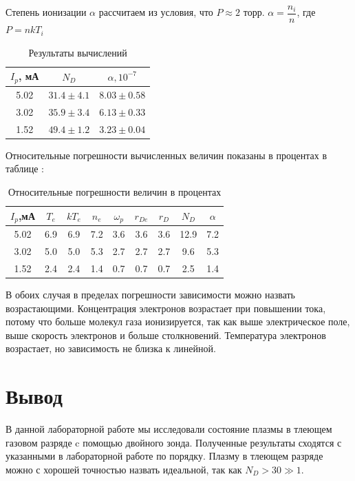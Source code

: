\documentclass[a4paper, 12pt]{article}
\begin{document}
	Степень ионизации $\alpha$ рассчитаем из условия, что $P \approx 2$ торр. $\alpha = \dfrac{n_i}{n}$, где $P = nkT_i$
	\begin{table}[h!]
		\centering
		\begin{tabular}{|c|c|c|}
			\hline
			$I_p$, мА & $N_D$ & $\alpha, 10^{-7}$ \\ \hline
			5.02 & $31.4 \pm 4.1 $ & $8.03 \pm 0.58$ \\ \hline
			3.02 & $35.9 \pm 3.4$ & $6.13 \pm 0.33$ \\ \hline
			1.52 & $49.4 \pm 1.2$ & $3.23 \pm 0.04$ \\ \hline
		\end{tabular}
		\caption{Результаты вычислений}
	\end{table}
	
	Относительные погрешности вычисленных величин показаны в процентах в таблице : 
	\begin{table}[h!]
		\centering
		\begin{tabular}{|c|c|c|c|c|c|c|c|c|}
			\hline
			$I_p$,мА & $T_e$ & $kT_e$ & $n_e$ & $\omega_p$ & $r_{De}$ & $r_D$ & $N_D$ & $\alpha$ \\ \hline
			 5.02 & 6.9 & 6.9 & 7.2 & 3.6 & 3.6 & 3.6 & 12.9 & 7.2 \\ \hline
			 3.02 & 5.0 & 5.0 & 5.3 & 2.7 & 2.7 & 2.7 & 9.6 & 5.3 \\ \hline
			 1.52 & 2.4 & 2.4 & 1.4 & 0.7 & 0.7 & 0.7 &2.5 & 1.4 \\ \hline
		\end{tabular}
		\caption{Относительные погрешности величин в процентах}
	\end{table}
	
	
	
	\newpage
	В обоих случая в пределах погрешности зависимости можно назвать возрастающими. Концентрация электронов возрастает при повышении тока, потому что больше молекул газа ионизируется, так как выше электрическое поле, выше скорость электронов и больше столкновений. Температура электронов возрастает, но зависимость не близка к линейной.
	
	\section*{Вывод}
	В данной лабораторной работе мы исследовали состояние плазмы в тлеющем газовом разряде c помощью двойного зонда. Полученные результаты сходятся с указанными в лабораторной работе по порядку. Плазму в тлеющем разряде можно с хорошей точностью назвать идеальной, так как $N_D > 30 \gg 1$.
\end{document}
